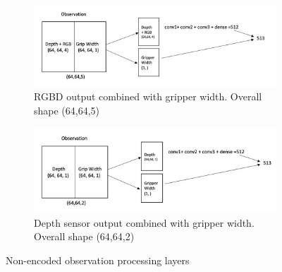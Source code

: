 \begin{figure}[htbp]
    \centering
    \begin{subfigure}{1\textwidth}
      \includegraphics[width=1\linewidth]{figures/RGBDobs}
      \caption{RGBD output combined with gripper width. Overall shape (64,64,5)} \label{fig:rgbobs}
    \end{subfigure}%
    \newline
    \begin{subfigure}{1\textwidth}
      \includegraphics[width=1\linewidth]{figures/depthobs}
      \caption{Depth sensor output combined with gripper width. Overall shape (64,64,2)} \label{fig:depthobs}
    \end{subfigure}%


\caption{ Non-encoded observation processing layers \label{fig:obsprocess}}
\end{figure}
